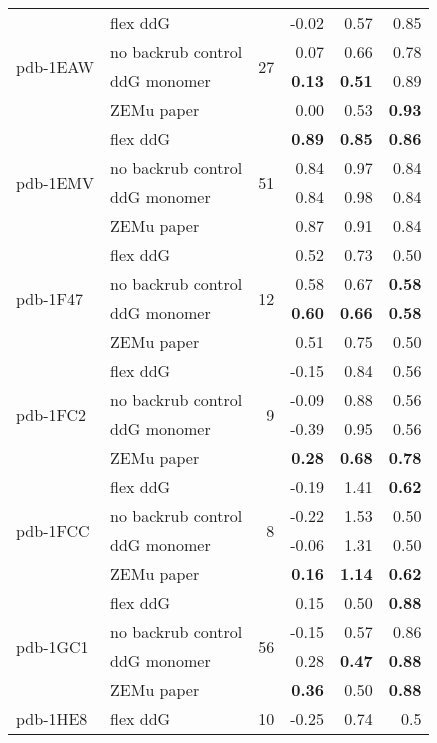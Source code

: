 \begin{table}
\begin{tabular}{llrrrr}
 \multirow{ 4}{*}{pdb-1EAW} & flex ddG & \multirow{ 4}{*}{27} & -0.02 & 0.57 & 0.85  \\
 & no backrub control & & 0.07 & 0.66 & 0.78  \\
 & ddG monomer & & \textbf{0.13} & \textbf{0.51} & 0.89  \\
 & ZEMu paper & & 0.00 & 0.53 & \textbf{0.93}  \\
\hline
 \multirow{ 4}{*}{pdb-1EMV} & flex ddG & \multirow{ 4}{*}{51} & \textbf{0.89} & \textbf{0.85} & \textbf{0.86}  \\
 & no backrub control & & 0.84 & 0.97 & 0.84  \\
 & ddG monomer & & 0.84 & 0.98 & 0.84  \\
 & ZEMu paper & & 0.87 & 0.91 & 0.84  \\
\hline
 \multirow{ 4}{*}{pdb-1F47} & flex ddG & \multirow{ 4}{*}{12} & 0.52 & 0.73 & 0.50  \\
 & no backrub control & & 0.58 & 0.67 & \textbf{0.58}  \\
 & ddG monomer & & \textbf{0.60} & \textbf{0.66} & \textbf{0.58}  \\
 & ZEMu paper & & 0.51 & 0.75 & 0.50  \\
\hline
 \multirow{ 4}{*}{pdb-1FC2} & flex ddG & \multirow{ 4}{*}{9} & -0.15 & 0.84 & 0.56  \\
 & no backrub control & & -0.09 & 0.88 & 0.56  \\
 & ddG monomer & & -0.39 & 0.95 & 0.56  \\
 & ZEMu paper & & \textbf{0.28} & \textbf{0.68} & \textbf{0.78}  \\
\hline
 \multirow{ 4}{*}{pdb-1FCC} & flex ddG & \multirow{ 4}{*}{8} & -0.19 & 1.41 & \textbf{0.62}  \\
 & no backrub control & & -0.22 & 1.53 & 0.50  \\
 & ddG monomer & & -0.06 & 1.31 & 0.50  \\
 & ZEMu paper & & \textbf{0.16} & \textbf{1.14} & \textbf{0.62}  \\
\hline
 \multirow{ 4}{*}{pdb-1GC1} & flex ddG & \multirow{ 4}{*}{56} & 0.15 & 0.50 & \textbf{0.88}  \\
 & no backrub control & & -0.15 & 0.57 & 0.86  \\
 & ddG monomer & & 0.28 & \textbf{0.47} & \textbf{0.88}  \\
 & ZEMu paper & & \textbf{0.36} & 0.50 & \textbf{0.88}  \\
\hline
 \multirow{ 4}{*}{pdb-1HE8} & flex ddG & \multirow{ 4}{*}{10} & -0.25 & 0.74 & 0.5  \\

\end{tabular}
\end{table}
